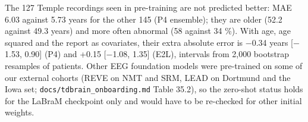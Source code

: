 \documentclass[11pt,a4paper]{article}
\begin{document}
The 127 Temple recordings seen in pre-training are not predicted better: MAE 6.03 against 5.73 years for the other 145 (P4 ensemble); they are older (52.2 against 49.3 years) and more often abnormal (58 against 34 \%). With age, age squared and the report as covariates, their extra absolute error is $-$0.34 years [$-$1.53, 0.90] (P4) and +0.15 [$-$1.08, 1.35] (E2L), intervals from 2,000 bootstrap resamples of patients. Other EEG foundation models were pre-trained on some of our external cohorts (REVE on NMT and SRM, LEAD on Dortmund and the Iowa set; \texttt{docs/tdbrain\_onboarding.md} Table 35.2), so the zero-shot status holds for the LaBraM checkpoint only and would have to be re-checked for other initial weights.



\end{document}
